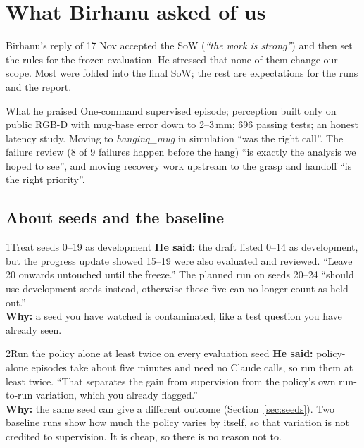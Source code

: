 \documentclass[11pt,a4paper]{article}
\begin{document}
\section{What Birhanu asked of us}\label{sec:asks}

Birhanu's reply of 17 Nov accepted the SoW (\emph{``the work is strong''}) and then set the rules for the frozen
evaluation. He stressed that none of them change our scope. Most were folded into the final SoW; the rest are
expectations for the runs and the report.

\begin{quotebox}{What he praised}
One-command supervised episode; perception built only on public RGB-D with mug-base error down to 2--3\,mm; 696
passing tests; an honest latency study. Moving to \emph{hanging\_mug} in simulation ``was the right call''. The failure
review (8 of 9 failures happen before the hang) ``is exactly the analysis we hoped to see'', and moving recovery work
upstream to the grasp and handoff ``is the right priority''.
\end{quotebox}

\subsection{About seeds and the baseline}

\begin{ask}{1}{Treat seeds 0--19 as development}
\textbf{He said:} the draft listed 0--14 as development, but the progress update showed 15--19 were also evaluated and
reviewed. ``Leave 20 onwards untouched until the freeze.'' The planned run on seeds 20--24 ``should use development
seeds instead, otherwise those five can no longer count as held-out.''\\[2pt]
\textbf{Why:} a seed you have watched is contaminated, like a test question you have already seen.
\end{ask}

\begin{ask}{2}{Run the policy alone at least twice on every evaluation seed}
\textbf{He said:} policy-alone episodes take about five minutes and need no Claude calls, so run them at least twice.
``That separates the gain from supervision from the policy's own run-to-run variation, which you already flagged.''\\[2pt]
\textbf{Why:} the same seed can give a different outcome (Section~\ref{sec:seeds}). Two baseline runs show how much the
policy varies by itself, so that variation is not credited to supervision. It is cheap, so there is no reason not to.
\end{ask}
\end{document}
